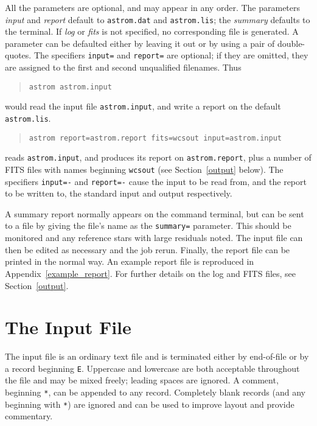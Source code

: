 \documentclass[twoside,11pt]{article}
\newcommand{\xlabel}[1]{}
\renewcommand{\_}{\texttt{\symbol{95}}}
\begin{document}
All the parameters are optional, and may appear in any order.  The
parameters \textit{input} and \textit{report} default to
\texttt{astrom.dat} and \texttt{astrom.lis}; the \textit{summary}
defaults to the terminal.  If \textit{log} or \textit{fits} is not
specified, no corresponding file is generated.  A parameter can be
defaulted either by leaving it out or by using a pair of
double-quotes.  The specifiers \texttt{input=} and \texttt{report=}
are optional; if they are omitted, they are assigned to the first and
second unqualified filenames.  Thus
\begin{quote}
\texttt{astrom astrom.input}
\end{quote}
would read the input file \texttt{astrom.input}, and write a report on
the default \texttt{astrom.lis}.
\begin{quote}
\texttt{astrom report=astrom.report fits=wcsout input=astrom.input}
\end{quote}
reads \texttt{astrom.input}, and produces its report on
\texttt{astrom.report}, plus a number of FITS files with names
beginning \texttt{wcsout} (see Section~\ref{output} below).  The
specifiers \texttt{input=-} and \texttt{report=-} cause the input to
be read from, and the report to be written to, the standard input and
output respectively.

A summary report normally appears on the command terminal, but can be
sent to a file by giving the file's name as the \texttt{summary=}
parameter.  This should be monitored and any reference stars with
large residuals noted.  The input file can then be edited as necessary
and the job rerun.  Finally, the report file can be printed in the
normal way.  An example report file is reproduced in
Appendix~\ref{example_report}.  For further details on the log and
FITS files, see Section~\ref{output}.

\section{\xlabel{the_input_file}The Input File}
\label{the_input_file}

The input file is an ordinary text file and is terminated either
by end-of-file or by a record beginning \texttt{E}.  Uppercase and
lowercase are both acceptable throughout the file and may be mixed freely;
leading spaces are ignored.  A comment, beginning \texttt{*}, can be
appended to any record.  Completely blank records (and any beginning
with \texttt{*}) are ignored and can be used to improve layout and
provide commentary.
\end{document}
